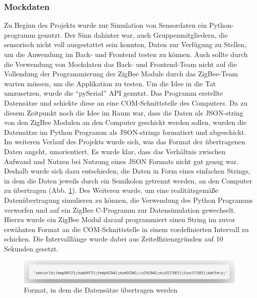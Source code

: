 \documentclass[]{article}
\begin{document}
			\subsubsection{Mockdaten}
			Zu Beginn des Projekts wurde zur Simulation von Sensordaten ein Python-programm genutzt. Der Sinn dahinter war, auch Gruppenmitgliedern, die sensorisch nicht voll ausgestattet sein konnten, Daten zur Verfügung zu Stellen, um die Anwendung im Back- und Frontend testen zu können. Auch sollte durch die Verwendung von Mockdaten das Back- und Frontend-Team nicht auf die Vollendung der Programmierung der ZigBee Module durch das ZigBee-Team warten müssen, um die Applikation zu testen.\newline			
Um die Idee in die Tat umzusetzen, wurde die “pySerial” API genutzt. Das Programm erstellte Datensätze und schickte diese an eine COM-Schnittstelle des Computers. Da zu diesem Zeitpunkt noch die Idee im Raum war, dass die Daten als JSON-string von den ZigBee Modulen an den Computer geschickt werden sollen, wurden die Datensätze im Python Programm als JSON-strings formatiert und abgeschickt.\newline
Im weiteren Verlauf des Projekts wurde sich, was das Format der übertragenen Daten angeht, umorientiert. Es wurde klar, dass das Verhältnis zwischen Aufwand und Nutzen bei Nutzung eines JSON Formats nicht gut genug war. Deshalb wurde sich dazu entschieden, die Daten in Form eines einfachen Strings, in dem die Daten jeweils durch ein Semikolon getrennt werden, an den Computer zu  übertragen (Abb. \ref{img:data_format}). Des Weiteren wurde, um eine realitätsgemäße Datenübertragung simulieren zu können, die Verwendung des Python Programms verworfen und auf ein ZigBee C-Programm zur Datensimulation gewechselt. Hierzu wurde ein ZigBee Modul darauf programmiert einen String im zuvor erwähnten Format an die COM-Schnittstelle in einem vordefinierten Intervall zu schicken. Die Intervalllänge wurde dabei aus Zeiteffizienzgründen auf 10 Sekunden gesetzt.
					\begin{figure}[!h]
						\centering
						\includegraphics[scale=0.223]{images/data_format}
						\caption{Format, in dem die Datensätze übertragen werden}
						\label{img:data_format}
					\end{figure}
\end{document}
